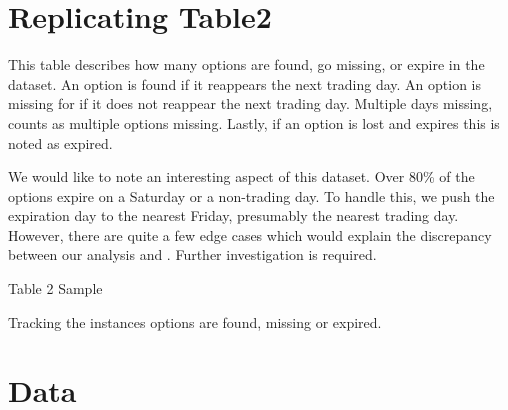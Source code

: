 



\section{Replicating Table2}
This table describes how many options are found, go missing, or expire in the dataset. An option is found if it reappears the next trading day. An option is missing for if it does not reappear the next trading day. Multiple days missing, counts as multiple options missing. Lastly, if an option is lost and expires this is noted as expired. 

We would like to note an interesting aspect of this dataset. Over 80\% of the options expire on a Saturday or a non-trading day. To handle this, we push the expiration day to the nearest Friday, presumably the nearest trading day. However, there are quite a few edge cases which would explain the discrepancy between our analysis and \citet{constantinides2013}. Further investigation is required. 


\newpage 

\thispagestyle{empty}
\begin{landscape}

\begin{table}
    \centering
    \caption{ Table  2 Sample}
    \label{t2s}
\resizebox{1.4\textwidth}{!}{
\hspace*{-4cm}
  
  }
  \caption*{Tracking the instances options are found, missing or expired.}
\end{table}

\end{landscape}
\newpage

\section{Data}

